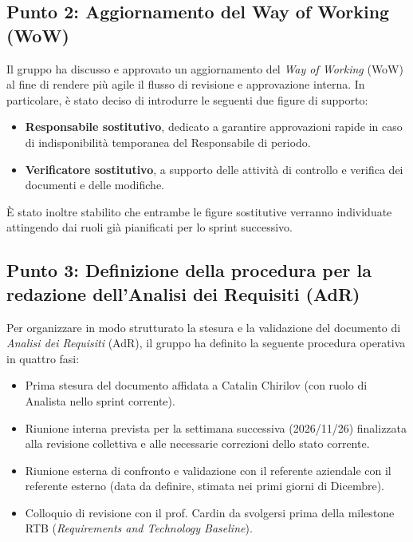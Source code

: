 \documentclass[a4paper, 11pt]{article}
\begin{document}
\subsection{Punto 2: Aggiornamento del Way of Working (WoW)}
Il gruppo ha discusso e approvato un aggiornamento del \textit{Way of Working} (WoW) al fine di rendere più agile il flusso di revisione e approvazione interna. In particolare, è stato deciso di introdurre le seguenti due figure di supporto:
\begin{itemize}
    \item \textbf{Responsabile sostitutivo}, dedicato a garantire approvazioni rapide in caso di indisponibilità temporanea del Responsabile di periodo.\vspace{-0.2cm}
    \item \textbf{Verificatore sostitutivo}, a supporto delle attività di controllo e verifica dei documenti e delle modifiche.
\end{itemize}
È stato inoltre stabilito che entrambe le figure sostitutive verranno individuate attingendo dai ruoli già pianificati per lo sprint successivo.

\subsection{Punto 3: Definizione della procedura per la redazione dell'Analisi dei Requisiti (AdR)}
Per organizzare in modo strutturato la stesura e la validazione del documento di \textit{Analisi dei Requisiti} (AdR), il gruppo ha definito la seguente procedura operativa in quattro fasi:
\begin{itemize}
    \item Prima stesura del documento affidata a Catalin Chirilov (con ruolo di Analista nello sprint corrente).\vspace{-0.2cm}
    \item Riunione interna prevista per la settimana successiva (2026/11/26) finalizzata alla revisione collettiva e alle necessarie correzioni dello stato corrente.\vspace{-0.2cm}
    \item Riunione esterna di confronto e validazione con il referente aziendale con il referente esterno (data da definire, stimata nei primi giorni di Dicembre).\vspace{-0.2cm}
    \item Colloquio di revisione con il prof. Cardin da svolgersi prima della milestone RTB (\textit{Requirements and Technology Baseline}).
\end{itemize}
\end{document}
